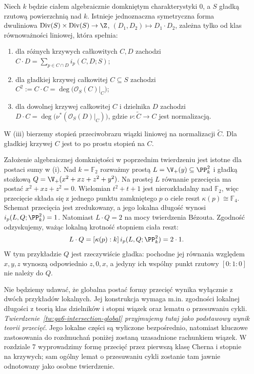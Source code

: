 \begin{twierdzenie}
\label{tw:ga6-intersection-global}
Niech $k$ będzie ciałem algebraicznie domkniętym
charakterystyki $0$, a $S$ gładką rzutową powierzchnią
nad $k$. Istnieje jednoznaczna symetryczna forma dwuliniowa
$\operatorname{Div}(S)\times\operatorname{Div}(S)\to\Z$,
$(D_1,D_2)\mapsto D_1\cdot D_2$, zależna tylko od klas
równoważności liniowej, która spełnia:
\begin{enumerate}[label=(\roman*)]
\item dla różnych krzywych całkowitych $C,D$ zachodzi
$C\cdot D=\sum_{p\in C\cap D}i_p(C,D;S)$;
\item dla gładkiej krzywej całkowitej $C\subseteq S$
zachodzi $C^2:=C\cdot C=\deg\bigl(\mathcal O_S(C)|_C\bigr)$;
\item dla dowolnej krzywej całkowitej $C$ i dzielnika $D$
zachodzi $D\cdot C=\deg\bigl(\nu^*(\mathcal O_S(D)|_C)\bigr)$,
gdzie $\nu:\widetilde C\to C$ jest normalizacją.
\end{enumerate}
W (iii) bierzemy stopień przeciwobrazu wiązki liniowej
na normalizacji $\widetilde C$. Dla gładkiej krzywej $C$
jest to po prostu stopień na $C$.
\end{twierdzenie}

\begin{przyklad}
Założenie algebraicznej domkniętości w poprzednim
twierdzeniu jest istotne dla postaci sumy w (i).
Nad $k=\mathbb F_2$ rozważmy prostą
$L=\V_+(y)\subseteq\PP^2_k$ i gładką stożkową
$Q=\V_+(x^2+xz+z^2+y^2)$.
Na prostej $L$ równanie przecięcia ma postać
$x^2+xz+z^2=0$. Wielomian $t^2+t+1$ jest
nierozkładalny nad $\mathbb F_2$, więc przecięcie
składa się z jednego punktu zamkniętego $p$
o ciele reszt $\kappa(p)\cong\mathbb F_4$.
Schemat przecięcia jest zredukowany, a jego lokalna
długość wynosi $i_p(L,Q;\PP^2_k)=1$.
Natomiast $L\cdot Q=2$ na mocy twierdzenia Bézouta.
Zgodność odzyskujemy, ważąc lokalną krotność stopniem
ciała reszt:
\[
  L\cdot Q=[\kappa(p):k]\,i_p(L,Q;\PP^2_k)=2\cdot1.
\]
W tym przykładzie $Q$ jest rzeczywiście gładka:
pochodne jej równania względem $x,y,z$
wynoszą odpowiednio $z,0,x$, a jedyny ich
wspólny punkt rzutowy $[0:1:0]$ nie należy do $Q$.
\end{przyklad}

\begin{uwaga}
Nie będziemy udawać, że globalna postać formy przecięć
wynika wyłącznie z dwóch przykładów lokalnych. Jej konstrukcja
wymaga m.in. zgodności lokalnej długości z teorią klas dzielników
i stopni wiązek oraz lematu o przesuwaniu cykli.
\emph{Twierdzenie~\ref{tw:ga6-intersection-global} przyjmujemy tutaj
jako podstawowy wynik teorii przecięć}. Jego lokalne części
są wyliczone bezpośrednio, natomiast kluczowe zastosowania
do rozdmuchań poniżej zostaną uzasadnione rachunkiem wiązek.
W rozdziale 7 wyprowadzimy formę przecięć przez
pierwszą klasę Cherna i stopnie na krzywych;
sam ogólny lemat o przesuwaniu cykli zostanie tam jawnie
odnotowany jako osobne twierdzenie.
\end{uwaga}

